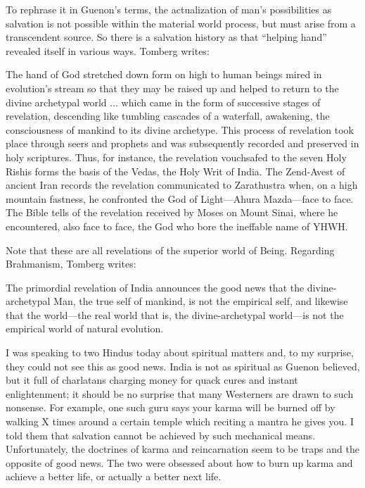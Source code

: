 To rephrase it in Guenon's terms, the actualization of man's possibilities as salvation is not possible within the material world process, but must arise from a transcendent source. So there is a salvation history as that ``helping hand'' revealed itself in various ways. Tomberg writes:

\begin{quotex}
The hand of God stretched down form on high to human beings mired in evolution's stream so that they may be raised up and helped to return to the divine archetypal world ... which came in the form of successive stages of revelation, descending like tumbling cascades of a waterfall, awakening, the consciousness of mankind to its divine archetype. This process of revelation took place through seers and prophets and was subsequently recorded and preserved in holy scriptures. Thus, for instance, the revelation vouchsafed to the seven Holy Rishis forms the basis of the Vedas, the Holy Writ of India. The Zend-Avest of ancient Iran records the revelation communicated to Zarathustra when, on a high mountain fastness, he confronted the God of Light---Ahura Mazda---face to face. The Bible tells of the revelation received by Moses on Mount Sinai, where he encountered, also face to face, the God who bore the ineffable name of YHWH.
\end{quotex}


Note that these are all revelations of the superior world of Being. Regarding Brahmanism, Tomberg writes:

\begin{quotex}
The primordial revelation of India announces the good news that the divine-archetypal Man, the true self of mankind, is not the empirical self, and likewise that the world---the real world that is, the divine-archetypal world---is not the empirical world of natural evolution.
\end{quotex}


I was speaking to two Hindus today about spiritual matters and, to my surprise, they could not see this as good news. India is not as spiritual as Guenon believed, but it full of charlatans charging money for quack cures and instant enlightenment; it should be no surprise that many Westerners are drawn to such nonsense. For example, one such guru says your karma will be burned off by walking X times around a certain temple which reciting a mantra he gives you. I told them that salvation cannot be achieved by such mechanical means. Unfortunately, the doctrines of karma and reincarnation seem to be traps and the opposite of good news. The two were obsessed about how to burn up karma and achieve a better life, or actually a better next life.

